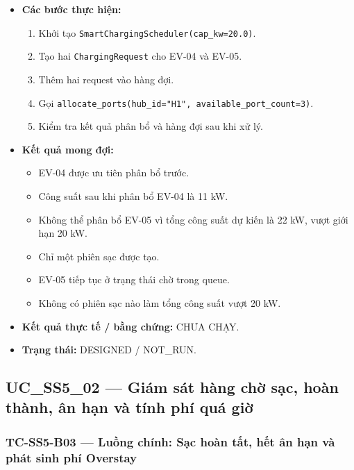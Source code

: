 \documentclass[11pt,a4paper]{article}
\providecommand{\tightlist}{%
  \setlength{\itemsep}{0pt}\setlength{\parskip}{0pt}}
\begin{document}
\begin{itemize}
\tightlist
\item
  \textbf{Các bước thực hiện:}

  \begin{enumerate}
  \def\labelenumi{\arabic{enumi}.}
  \tightlist
  \item
    Khởi tạo \texttt{SmartChargingScheduler(cap\_kw=20.0)}.
  \item
    Tạo hai \texttt{ChargingRequest} cho EV-04 và EV-05.
  \item
    Thêm hai request vào hàng đợi.
  \item
    Gọi
    \texttt{allocate\_ports(hub\_id="H1",\ available\_port\_count=3)}.
  \item
    Kiểm tra kết quả phân bổ và hàng đợi sau khi xử lý.
  \end{enumerate}
\item
  \textbf{Kết quả mong đợi:}

  \begin{itemize}
  \tightlist
  \item
    EV-04 được ưu tiên phân bổ trước.
  \item
    Công suất sau khi phân bổ EV-04 là 11 kW.
  \item
    Không thể phân bổ EV-05 vì tổng công suất dự kiến là 22 kW, vượt
    giới hạn 20 kW.
  \item
    Chỉ một phiên sạc được tạo.
  \item
    EV-05 tiếp tục ở trạng thái chờ trong queue.
  \item
    Không có phiên sạc nào làm tổng công suất vượt 20 kW.
  \end{itemize}
\item
  \textbf{Kết quả thực tế / bằng chứng:} CHƯA CHẠY.
\item
  \textbf{Trạng thái:} DESIGNED / NOT\_RUN.
\end{itemize}

\hypertarget{uc_ss5_02-giuxe1m-suxe1t-huxe0ng-chux1edd-sux1ea1c-houxe0n-thuxe0nh-uxe2n-hux1ea1n-vuxe0-tuxednh-phuxed-quuxe1-giux1edd}{%
\subsection{UC\_SS5\_02 --- Giám sát hàng chờ sạc, hoàn thành, ân hạn và
tính phí quá
giờ}\label{uc_ss5_02-giuxe1m-suxe1t-huxe0ng-chux1edd-sux1ea1c-houxe0n-thuxe0nh-uxe2n-hux1ea1n-vuxe0-tuxednh-phuxed-quuxe1-giux1edd}}

\hypertarget{tc-ss5-b03-luux1ed3ng-chuxednh-sux1ea1c-houxe0n-tux1ea5t-hux1ebft-uxe2n-hux1ea1n-vuxe0-phuxe1t-sinh-phuxed-overstay}{%
\subsubsection{TC-SS5-B03 --- Luồng chính: Sạc hoàn tất, hết ân hạn và
phát sinh phí
Overstay}\label{tc-ss5-b03-luux1ed3ng-chuxednh-sux1ea1c-houxe0n-tux1ea5t-hux1ebft-uxe2n-hux1ea1n-vuxe0-phuxe1t-sinh-phuxed-overstay}}
\end{document}
